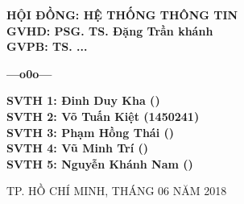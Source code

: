 \begin{titlepage}
\hspace{4.5cm}	
\begin{minipage}[t]{0.7\linewidth}
\large
	\textbf{HỘI ĐỒNG: HỆ THỐNG THÔNG TIN}\\ [0.5cm]
	\textbf{GVHD: PSG. TS. Đặng Trần khánh}\\ [0.5cm]
	\textbf{GVPB: TS. ...}\\
	\vspace{-0.7cm}
	\begin{center}
	\textbf{---o0o---}
	\end{center}
	\textbf{SVTH 1: Đinh Duy Kha ()}\\ [0.5cm]
	\textbf{SVTH 2: Võ Tuấn Kiệt (1450241)}\\[0.5cm]
	\textbf{SVTH 3: Phạm Hồng Thái ()}\\[0.5cm]
	\textbf{SVTH 4: Vũ Minh Trí ()}\\[0.5cm]
	\textbf{SVTH 5: Nguyễn Khánh Nam ()}\\[0.5cm]
\end{minipage}

\vfill
\centerline{\large{TP. HỒ CHÍ MINH, THÁNG 06 NĂM 2018}}
\end{titlepage}